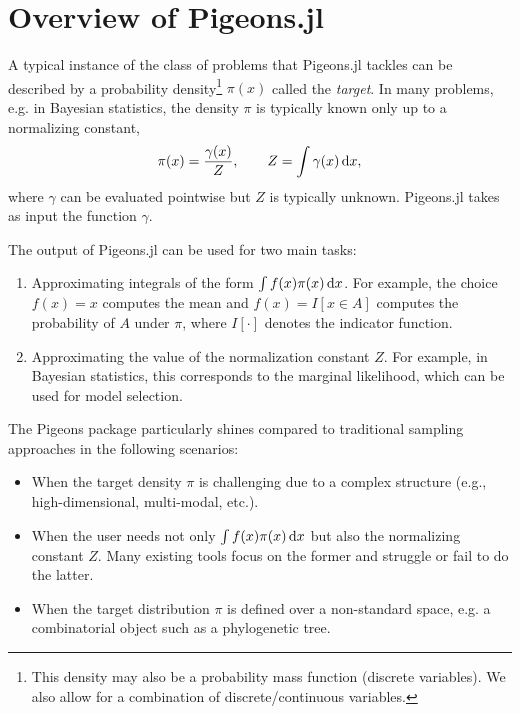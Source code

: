 \section{Overview of Pigeons.jl}
A typical instance of the class of problems that Pigeons.jl tackles can be described by
a probability density\footnote{This density may also be a probability mass function 
(discrete variables). We also allow for a combination of discrete/continuous variables.} 
$\pi(x)$ called the \emph{target}. In many problems, e.g. in Bayesian statistics, the 
density $\pi$ is typically known only up to a normalizing constant, 
\[
\label{eq:normalizing_constant}
  \pi(x) = \frac{\gamma(x)}{Z}, \qquad Z = \int \gamma(x) \, \dee x,
\]  
where $\gamma$ can be evaluated pointwise but $Z$ is typically unknown.
Pigeons.jl takes as input the function $\gamma$.

 
The output of Pigeons.jl can be used for two main tasks:
\begin{enumerate}
    \item Approximating integrals of the form $\int f(x) \pi(x) \, \mathrm{d} x$.  
    For example, the choice $f(x) = x$ computes the mean and 
    $f(x) = I[x \in A]$ computes the probability of $A$ under $\pi$,
    where $I[\cdot]$ denotes the indicator function.

    \item Approximating the value of the normalization constant $Z$. For 
    example, in Bayesian statistics, this corresponds to the 
    marginal likelihood, which can be used for model selection. 
\end{enumerate}
The Pigeons package particularly shines compared to traditional sampling approaches in the 
following scenarios:
\begin{itemize}
    \item When the target density $\pi$ is challenging due to a complex structure 
    (e.g., high-dimensional, multi-modal, etc.).
    
    \item When the user needs not only $\int f(x) \pi(x) \, \mathrm{d} x$ but also
    the normalizing constant $Z$. 
    Many existing tools focus on the former and struggle or fail to do the latter. 
    
    \item When the target distribution $\pi$ is defined over a non-standard space, 
    e.g. a combinatorial object such as a phylogenetic tree.  
\end{itemize}

